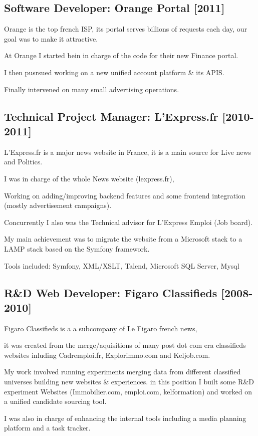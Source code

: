 \documentclass{article}
\begin{document}
\subsection*{Software Developer: Orange Portal [2011]}
Orange is the top french ISP, its portal serves billions of requests each day, our goal was to make it attractive.

At Orange I started bein in charge of the code for their new Finance portal.

I then pusrsued working on a new unified account platform \& its APIS.

Finally intervened on many small advertising operations.

\subsection*{Technical Project Manager: L'Express.fr [2010-2011]}
L'Express.fr is a major news website in France, it is a main source for Live news and Politics.

I was in charge of the whole News website (lexpress.fr),

Working on adding/improving backend features and some frontend integration (mostly advertisement campaigns).

Concurrently I also was the Technical advisor for L’Express Emploi (Job board).

My main achievement was to migrate the website from a Microsoft stack to a LAMP stack based on the Symfony framework.

Tools included: Symfony, XML/XSLT, Talend, Microsoft SQL Server, Mysql

\subsection*{R\&D Web Developer: Figaro Classifieds [2008-2010]}
Figaro Classifieds is a a subcompany of Le Figaro french news,

it was created from the merge/aquisitions of many post dot com era classifieds websites inluding
 Cadremploi.fr, Explorimmo.com and Keljob.com.


My work involved running experiments merging data from different classified universes building new websites \& experiences.
in this position I built some R\&D experiment Websites (Immobilier.com, emploi.com, kelformation)
and worked on a unified candidate sourcing tool.

I was also in charge of enhancing the internal tools including a media planning platform and a task tracker.
\end{document}
